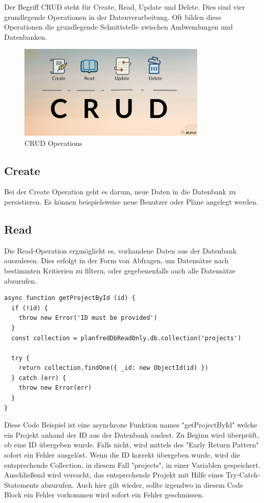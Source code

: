 Der Begriff CRUD steht für Create, Read, Update und Delete. Dies sind vier grundlegende Operationen in der Datenverarbeitung. Oft bilden diese Operationen die grundlegende Schnittstelle zwischen Andwendungen und Datenbanken.
\newline
\begin{figure}[h!]
    \centering
    \includegraphics[width=0.8\textwidth]{pics/CRUD.jpeg}
    \caption{CRUD Operations}
    \label{fig:enter-label}
\end{figure}


 \subsection{Create}

 Bei der Create Operation geht es darum, neue Daten in die Datenbank zu persistieren. Es können beispielsweise neue Benutzer oder Pläne angelegt werden.


 \subsection{Read}

 Die Read-Operation ergmöglicht es, vorhandene Daten aus der Datenbank auszulesen. Dies erfolgt in der Form von Abfragen, um Datensätze nach bestimmten Kritierien zu filtern, oder gegebenenfalls auch alle Datensätze abzurufen.

\begin{lstlisting}[caption=Read-Operation]
async function getProjectById (id) {
  if (!id) {
    throw new Error('ID must be provided')
  }
  const collection = planfredDbReadOnly.db.collection('projects')

  try {
    return collection.findOne({ _id: new ObjectId(id) })
  } catch (err) {
    throw new Error(err)
  }
}
\end{lstlisting}

Diese Code Beispiel ist eine asynchrone Funktion names "getProjectById" welche ein Projekt anhand der ID aus der Datenbank auslest.\newline
Zu Beginn wird überprüft, ob eine ID übergeben wurde. Falls nicht, wird mittels des "Early Return Pattern" sofort ein Fehler ausgelöst. Wenn die ID korrekt übergeben wurde, wird die entsprechende Collection, in diesem Fall "projects", in einer Variablen gespeichert. Anschließend wird versucht, das entsprechende Projekt mit Hilfe eines Try-Catch-Statements abzurufen. Auch hier gilt wieder, sollte irgendwo in diesem Code Block ein Fehler vorkommen wird sofort ein Fehler geschmissen.



